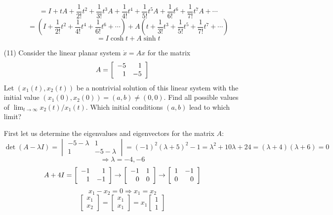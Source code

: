 \documentclass[12pt,letterpaper,reqno]{amsart}
\begin{document}
\begin{enumerate}
\begin{enumerate}
\begin{flushleft}
    $$= I + tA + \frac { 1 } { 2 ! } t^2 + \frac { 1 } { 3 ! } t^3A + \frac { 1 } { 4 ! } t^4 + \frac { 1 } { 5 ! } t^5A + \frac { 1 } { 6 ! } t^6 + \frac { 1 } { 7 ! } t^7A + \cdots$$
    $$= (I + \frac { 1 } { 2 ! } t^2 + \frac { 1 } { 4 ! } t^4 + \frac { 1 } { 6 ! } t^6 + \cdots) + A(t + \frac { 1 } { 3 ! } t^3 + \frac { 1 } { 5 ! } t^5 + \frac { 1 } { 7 ! } t^7 + \cdots)$$
    $$= I\cosh{t} + A\sinh{t}$$
    \end{flushleft}
\end{enumerate}
\newpage
\item[(11)] Consider the linear planar system $\dot{x} = Ax$ for the matrix \newline
$$A = \left[ \begin{array} { r r } { - 5 } & { 1 } \\ { 1 } & { - 5 } \end{array} \right]$$
Let $(x_1(t),x_2(t))$ be a nontrivial solution of this linear system with the initial value $(x_1(0),x_2(0)) = (a,b) \not= (0,0)$. Find all possible values of $\lim_{t\rightarrow\infty}x_2(t)/x_1(t)$. Which initial conditions $(a,b)$ lead to which limit?
\begin{flushleft}
First let us determine the eigenvalues and eigenvectors for the matrix $A$:
$$\det(A-\lambda I) = \begin{vmatrix} { -5 - \lambda } & { 1 } \\ { 1 } & { -5 - \lambda }\end{vmatrix} = (-1)^2(\lambda + 5)^2 - 1 = \lambda^2 + 10\lambda + 24 = (\lambda + 4)(\lambda + 6) = 0$$
$$\Rightarrow \lambda = -4,-6$$
$$A+4I = \left[ \begin{array} { r r } { -1 } & { 1 } \\ { 1 } & { -1 } \end{array} \right] \rightarrow \left[ \begin{array} { r r } { - 1 } & { 1 } \\ { 0 } & { 0 } \end{array} \right] \rightarrow \left[ \begin{array} { r r } { 1 } & { -1 } \\ { 0 } & { 0 } \end{array} \right]$$
$$x_1 - x_2 = 0 \Rightarrow x_1 = x_2$$
$$\left[ \begin{array} { r } { x_1 } \\ { x_2 } \end{array} \right] = \left[ \begin{array} { r } { x_1 } \\ { x_1 } \end{array} \right] = x_1\left[ \begin{array} { r } { 1 } \\ { 1 } \end{array} \right]$$

\end{flushleft}
\end{enumerate}
\end{document}
